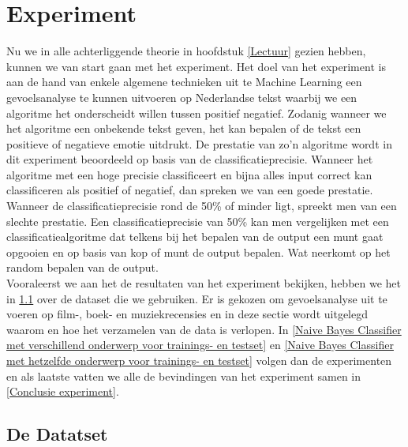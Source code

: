 \chapter{Experiment}\label{Experiment}

Nu we in alle achterliggende theorie in hoofdstuk \ref{Lectuur} gezien hebben, kunnen we van start gaan met het experiment. Het doel van het experiment is aan de hand van enkele algemene technieken uit te Machine Learning een gevoelsanalyse te kunnen uitvoeren op Nederlandse tekst waarbij we een algoritme het onderscheidt willen tussen positief negatief. Zodanig wanneer we het algoritme een onbekende tekst geven, het kan bepalen of de tekst een positieve of negatieve emotie uitdrukt. De prestatie van zo'n algoritme wordt in dit experiment beoordeeld op basis van de classificatieprecisie.  Wanneer het algoritme met een hoge precisie classificeert en bijna alles input correct kan classificeren als positief of negatief, dan spreken we van een goede prestatie. Wanneer de classificatieprecisie rond de 50\% of minder ligt, spreekt men van een slechte prestatie. Een classificatieprecisie van 50\% kan men vergelijken met een classificatiealgoritme dat telkens bij het bepalen van de output een munt gaat opgooien en op basis van kop of munt de output bepalen. Wat neerkomt op het random bepalen van de output.\\
%
Vooraleerst we aan het de resultaten van het experiment bekijken, hebben we het in \ref{De Dataset} over de dataset die we gebruiken. Er is gekozen om gevoelsanalyse uit te voeren op film-, boek- en muziekrecensies  en in deze sectie wordt uitgelegd waarom en hoe het verzamelen van de data is verlopen. In \ref{Naive Bayes Classifier met verschillend onderwerp voor trainings- en testset} en \ref{Naive Bayes Classifier met hetzelfde onderwerp voor trainings- en testset} volgen dan de experimenten en als laatste vatten we alle de bevindingen van het experiment samen in \ref{Conclusie experiment}.

\section{De Datatset}\label{De Dataset}

